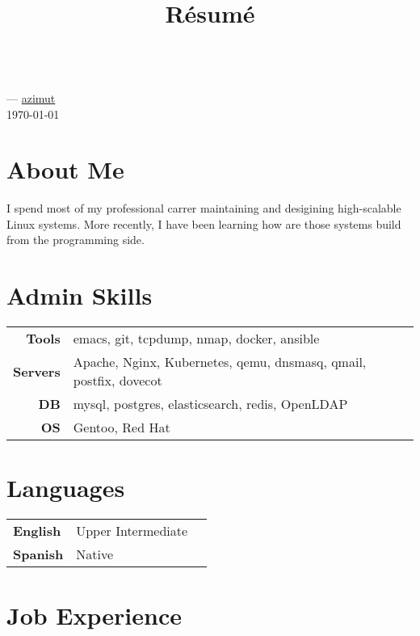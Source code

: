 \documentclass[11pt]{article}
\renewcommand{\maketitle}{
  \begin{center}{\huge\bfseries\theauthor} \\
    \vspace{.25em}
    {\faEnvelope} \href {mailto:\MAILTO} {\expandafter\randomize\expandafter{\MAILTO}}
    ---
    {\faGithub} \href {https://github.com/azimut} {azimut} \\
    \vspace{.25em}
    \today
  \end{center}
}
\begin{document}
\title{R\'esum\'e}
\author{\FULLNAME}

\maketitle


\section{About Me}

I spend most of my professional carrer maintaining and desigining high-scalable Linux systems. More recently, I have been learning how are those systems build from the programming side.


\section{Admin Skills}


\begin{tabular}{@{}rll@{}}
  \hspace{.1em} \textbf{Tools}   & emacs, git, tcpdump, nmap, docker, ansible \\
  \hspace{.1em} \textbf{Servers} & Apache, Nginx, Kubernetes, qemu, dnsmasq, qmail, postfix, dovecot \\
  \hspace{.1em} \textbf{DB}      & mysql, postgres, elasticsearch, redis, OpenLDAP \\
  \hspace{.1em} \textbf{OS}      & Gentoo, Red Hat
\end{tabular}


\section{Languages}


\begin{tabular}{@{}lll@{}}
  \hspace{.1em} \textbf{English} & Upper Intermediate \\
  \hspace{.1em} \textbf{Spanish} & Native \\
\end{tabular}


\section{Job Experience}
\end{document}
